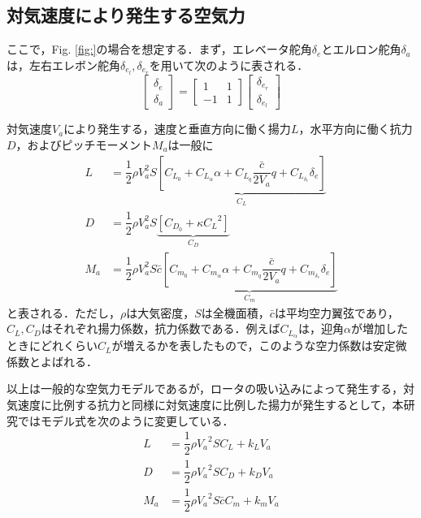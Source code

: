 \subsection{対気速度により発生する空気力}
\label{sec:airspeed_airf}

ここで，Fig. \ref{fig:}の場合を想定する．まず，エレベータ舵角$\delta_e$とエルロン舵角$\delta_a$は，左右エレボン舵角$\delta_{e_l}, \delta_{e_r}$を用いて次のように表される．
\begin{equation}
  \left[
    \begin{array}{ccc}
      \delta_e \\
      \delta_a
    \end{array}
  \right] =
  \left[
    \begin{array}{ccc}
      1 & 1 \\
      -1 & 1
    \end{array}
  \right]
  \left[
    \begin{array}{ccc}
      \delta_{e_r} \\
      \delta_{e_l}
    \end{array}
  \right]
\end{equation}

対気速度$V_a$により発生する，速度と垂直方向に働く揚力$L$，水平方向に働く抗力$D$，およびピッチモーメント$M_a$は一般に
\begin{align}
  L &= \dfrac{1}{2}\rho V_a^2 S \underbrace{\left[ C_{L_0}
  +C_{L_\alpha}\alpha+C_{L_q}\dfrac{\bar{c}}{2V_a}q+C_{L_{\delta_e}}\delta_e \right]}_{C_L} \\
  D &= \dfrac{1}{2}\rho V_a^2 S \underbrace{\left[ C_{D_0}+\kappa {C_L}^2 \right]}_{C_D} \\
  M_a &= \dfrac{1}{2}\rho V_a^2 S \bar{c} \underbrace{\left[ C_{m_0}
  +C_{m_\alpha}\alpha+C_{m_q}\dfrac{\bar{c}}{2V_a}q+C_{m_{\delta_e}}\delta_e \right]}_{C_m}
\end{align}
と表される．ただし，$\rho$は大気密度，$S$は全機面積，$\bar{c}$は平均空力翼弦であり，$C_L,C_D$はそれぞれ揚力係数，抗力係数である．例えば$C_{L_\alpha}$は，迎角$\alpha$が増加したときにどれくらい$C_L$が増えるかを表したもので，このような空力係数は安定微係数とよばれる．

以上は一般的な空気力モデルであるが，ロータの吸い込みによって発生する，対気速度に比例する抗力\cite{}と同様に対気速度に比例した揚力が発生するとして，本研究ではモデル式を次のように変更している\cite{}．
\begin{align}
  L &= \dfrac{1}{2}\rho {V_a}^2 S C_L + k_L V_a \\[5pt]
  D &= \dfrac{1}{2}\rho {V_a}^2 S C_D + k_D V_a \\[5pt]
  M_a &= \dfrac{1}{2}\rho {V_a}^2 S \bar{c} C_m + k_m V_a
\end{align}

